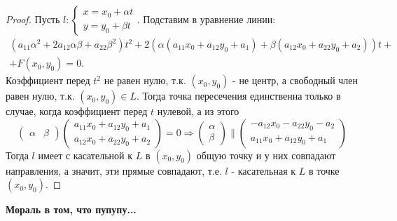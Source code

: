 \documentclass[a4paper, 12pt]{article}
\theoremstyle{definition}
\begin{document}
	\begin{proof}
		Пусть $l: \begin{cases}x = x_0 + \alpha t\\y = y_0 + \beta t\end{cases}$. Подставим в уравнение линии: \begin{align*}
			(a_{11}\alpha^2 + 2a_{12}\alpha\beta + a_{22}\beta^2)t^2 + 2(\alpha(a_{11}x_0 + a_{12}y_0 + a_1) + \beta(a_{12}x_0 + a_{22}y_0 + a_2))t +\\+ F(x_0, y_0) = 0.
		\end{align*}
		Коэффициент перед $t^2$ не равен нулю, т.к. $(x_0, y_0)$ - не центр, а свободный член равен нулю, т.к. $(x_0, y_0)\in L$. Тогда точка пересечения единственна только в случае, когда коэффициент перед $t$ нулевой, а из этого $$\begin{pmatrix} \alpha & \beta \end{pmatrix}\begin{pmatrix} a_{11}x_0 + a_{12}y_0 + a_1 \\ a_{12}x_0 + a_{22}y_0 + a_2 \end{pmatrix} = 0 \Rightarrow \begin{pmatrix} \alpha \\ \beta \end{pmatrix} \parallel \begin{pmatrix} -a_{12}x_0 - a_{22}y_0 - a_2 \\ a_{11}x_0 + a_{12}y_0 + a_1 \end{pmatrix}$$
		Тогда $l$ имеет с касательной к $L$ в $(x_0, y_0)$ общую точку и у них совпадают направления, а значит, эти прямые совпадают, т.е. $l$ - касательная к $L$ в точке $(x_0, y_0)$.
	\end{proof}
	\bfseries Мораль в том, что пупупу...\mdseries
\end{document}
